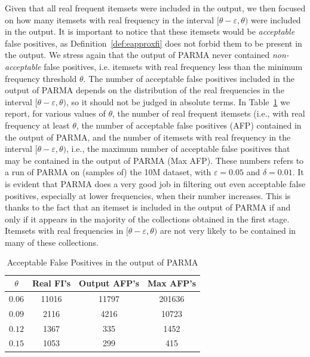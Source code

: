Given that all real frequent itemsets were included in the output, we then
focused on how many itemsets with real frequency in the interval
$[\theta-\varepsilon,\theta)$ were included in the output. It is important to
notice that these itemsets would be \emph{acceptable} false positives, as
Definition~\ref{def:eapproxfi} does not forbid them to be present in the output.
We stress again that the output of PARMA never contained \emph{non-acceptable}
false positives, i.e. itemsets with real frequency less than the minimum
frequency threshold $\theta$. The number of acceptable false positives included in the
output of PARMA depends on the distribution of the real frequencies in the
interval $[\theta-\varepsilon,\theta)$, so it should not be judged in absolute
terms. In Table~\ref{tab:falsepositives} we report, for various values of
$\theta$, the number of real frequent itemsets (i.e., with real frequency at
least $\theta$, the number of acceptable false positives (AFP) contained in the output
of PARMA, and the number of itemsets with real frequency in the interval
$[\theta-\varepsilon,\theta)$, i.e., the maximum number of acceptable false
positives that may be contained in the output of PARMA (Max AFP). These numbers
refers to a run of PARMA on (samples of) the 10M dataset, with
$\varepsilon=0.05$ and $\delta=0.01$. It is evident that PARMA does a very good
job in filtering out even acceptable false positives, especially at lower
frequencies, when their number increases. This is thanks to the fact that  an
itemset is included in the output of PARMA if and only if it appears in the
majority of the collections obtained in the first stage. Itemsets with real frequencies
in $[\theta-\varepsilon,\theta)$ are not very likely to be contained in many of
these collections.

\begin{table}
  \centering
  \begin{tabular}{cccc}
    \hline
    $\theta$ & Real FI's & Output AFP's & Max AFP's \\
    \hline
    $0.06$ & 11016 & 11797 & 201636 \\
    $0.09$ & 2116& 4216& 10723 \\
    $0.12$ & 1367& 335& 1452\\
    $0.15$ & 1053& 299& 415\\
    \hline
  \end{tabular}
  \caption{Acceptable False Positives in the output of PARMA}
  \label{tab:falsepositives}
\end{table}

